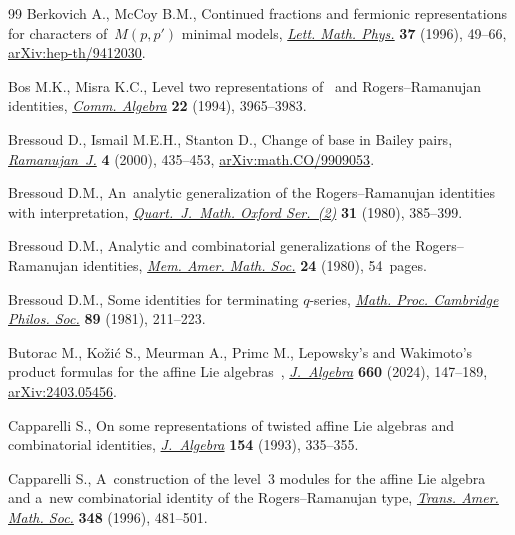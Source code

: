 \documentclass[pdftex]{sigma}
\numberwithin{equation}{section}
\begin{document}
\begin{thebibliography}{99}
Berkovich A., McCoy B.M., Continued fractions and fermionic representations for
 characters of~{$M(p,p')$} minimal models,
 \href{https://doi.org/10.1007/BF00400138}{\textit{Lett. Math. Phys.}}
 \textbf{37} (1996), 49--66,
 \href{http://arxiv.org/abs/hep-th/9412030}{arXiv:hep-th/9412030}.

Bos M.K., Misra K.C., Level two representations of~ and
 {R}ogers--{R}amanujan identities,
 \href{https://doi.org/10.1080/00927879408825059}{\textit{Comm. Algebra}}
 \textbf{22} (1994), 3965--3983.

Bressoud D., Ismail M.E.H., Stanton D., Change of base in {B}ailey pairs,
 \href{https://doi.org/10.1023/A:1009824218230}{\textit{Ramanujan~J.}}
 \textbf{4} (2000), 435--453,
 \href{http://arxiv.org/abs/math.CO/9909053}{arXiv:math.CO/9909053}.

Bressoud D.M., An~analytic generalization of the {R}ogers--{R}amanujan
 identities with interpretation,
 \href{https://doi.org/10.1093/qmath/31.4.385}{\textit{Quart.~J.~Math. Oxford
 Ser.~(2)}} \textbf{31} (1980), 385--399.

Bressoud D.M., Analytic and combinatorial generalizations of the
 {R}ogers--{R}amanujan identities,
 \href{https://doi.org/10.1090/memo/0227}{\textit{Mem. Amer. Math. Soc.}}
 \textbf{24} (1980), 54~pages.

Bressoud D.M., Some identities for terminating {$q$}-series,
 \href{https://doi.org/10.1017/S0305004100058114}{\textit{Math. Proc.
 Cambridge Philos. Soc.}} \textbf{89} (1981), 211--223.

Butorac M., Ko\v{z}i\'c S., Meurman A., Primc M., Lepowsky's and {W}akimoto's
 product formulas for the affine {L}ie algebras~,
 \href{https://doi.org/10.1016/j.jalgebra.2024.06.040}{\textit{J.~Algebra}}
 \textbf{660} (2024), 147--189,
 \href{http://arxiv.org/abs/2403.05456}{arXiv:2403.05456}.

Capparelli S., On some representations of twisted affine {L}ie algebras and
 combinatorial identities,
 \href{https://doi.org/10.1006/jabr.1993.1017}{\textit{J.~Algebra}}
 \textbf{154} (1993), 335--355.

Capparelli S., A~construction of the level~{$3$} modules for the affine {L}ie
 algebra~ and a~new combinatorial identity of the
 {R}ogers--{R}amanujan type,
 \href{https://doi.org/10.1090/S0002-9947-96-01535-8}{\textit{Trans. Amer.
 Math. Soc.}} \textbf{348} (1996), 481--501.


\end{thebibliography}
\end{document}
